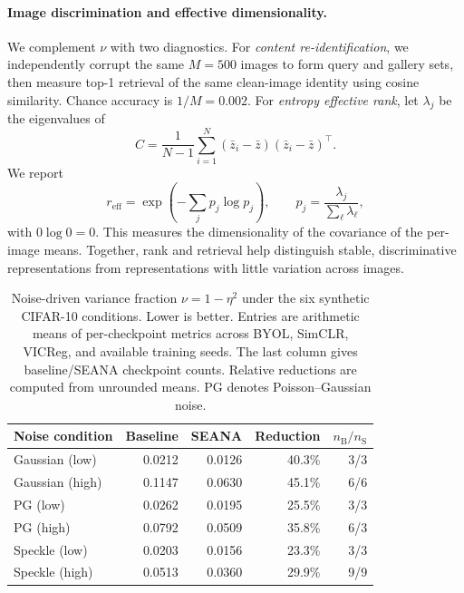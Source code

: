 \paragraph{Image discrimination and effective dimensionality.}
We complement $\nu$ with two diagnostics. For \emph{content re-identification},
we independently corrupt the same $M=500$ images to form query and gallery
sets, then measure top-1 retrieval of the same clean-image identity using cosine
similarity. Chance accuracy is $1/M=0.002$.
For \emph{entropy effective rank}, let $\lambda_j$ be the eigenvalues of
\begin{equation}
    C = \frac{1}{N-1}\sum_{i=1}^{N}
        (\bar z_i-\bar z)(\bar z_i-\bar z)^\top.
\end{equation}
We report
\begin{equation}
    r_{\mathrm{eff}} = \exp\!\left(-\sum_j p_j\log p_j\right),
    \qquad p_j = \frac{\lambda_j}{\sum_\ell\lambda_\ell},
    \label{eq:entropy_effective_rank}
\end{equation}
with $0\log 0=0$.
This measures the dimensionality of the covariance of the per-image means.
Together, rank and retrieval help distinguish stable, discriminative
representations from representations with little variation across images.

\begin{table}[t]
    \centering
    \small
    \setlength{\tabcolsep}{5pt}
    \caption{Noise-driven variance fraction $\nu=1-\eta^2$ under the six
    synthetic CIFAR-10 conditions. Lower is better. Entries are arithmetic
    means of per-checkpoint metrics across BYOL, SimCLR, VICReg, and available
    training seeds. The last column gives baseline/SEANA checkpoint counts.
    Relative reductions are computed from unrounded means.
    PG denotes Poisson--Gaussian noise.}
    \label{tab:representation_noise_fraction}
    \begin{tabular}{lrrrr}
        \toprule
        Noise condition & Baseline & SEANA & Reduction & $n_{\mathrm{B}}/n_{\mathrm{S}}$ \\
        \midrule
        Gaussian (low)  & 0.0212 & 0.0126 & 40.3\% & 3/3 \\
        Gaussian (high) & 0.1147 & 0.0630 & 45.1\% & 6/6 \\
        PG (low)        & 0.0262 & 0.0195 & 25.5\% & 3/3 \\
        PG (high)       & 0.0792 & 0.0509 & 35.8\% & 6/3 \\
        Speckle (low)   & 0.0203 & 0.0156 & 23.3\% & 3/3 \\
        Speckle (high)  & 0.0513 & 0.0360 & 29.9\% & 9/9 \\
        \bottomrule
    \end{tabular}
\end{table}

